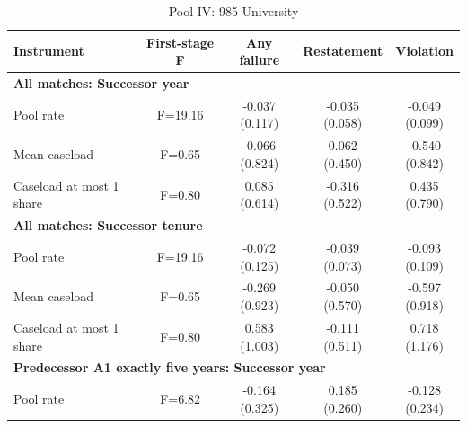 \begin{table}[htbp]
\footnotesize
\def\sym#1{\ifmmode^{#1}\else\(^{#1}\)\fi}
\centering
\caption{Pool IV: 985 University}
\begin{threeparttable}
\begin{tabular}{p{}cccc}
\toprule
Instrument & First-stage F & Any failure & Restatement & Violation \\
\midrule
\multicolumn{5}{l}{\textbf{All matches: Successor year}} \\
Pool rate & F=19.16 & \shortstack{-0.037\\(0.117)} & \shortstack{-0.035\\(0.058)} & \shortstack{-0.049\\(0.099)} \\
Mean caseload & F=0.65 & \shortstack{-0.066\\(0.824)} & \shortstack{0.062\\(0.450)} & \shortstack{-0.540\\(0.842)} \\
Caseload at most 1 share & F=0.80 & \shortstack{0.085\\(0.614)} & \shortstack{-0.316\\(0.522)} & \shortstack{0.435\\(0.790)} \\
\multicolumn{5}{l}{\textbf{All matches: Successor tenure}} \\
Pool rate & F=19.16 & \shortstack{-0.072\\(0.125)} & \shortstack{-0.039\\(0.073)} & \shortstack{-0.093\\(0.109)} \\
Mean caseload & F=0.65 & \shortstack{-0.269\\(0.923)} & \shortstack{-0.050\\(0.570)} & \shortstack{-0.597\\(0.918)} \\
Caseload at most 1 share & F=0.80 & \shortstack{0.583\\(1.003)} & \shortstack{-0.111\\(0.511)} & \shortstack{0.718\\(1.176)} \\
\multicolumn{5}{l}{\textbf{Predecessor A1 exactly five years: Successor year}} \\
Pool rate & F=6.82 & \shortstack{-0.164\\(0.325)} & \shortstack{0.185\\(0.260)} & \shortstack{-0.128\\(0.234)} \\

\end{tabular}
\end{threeparttable}
\end{table}
